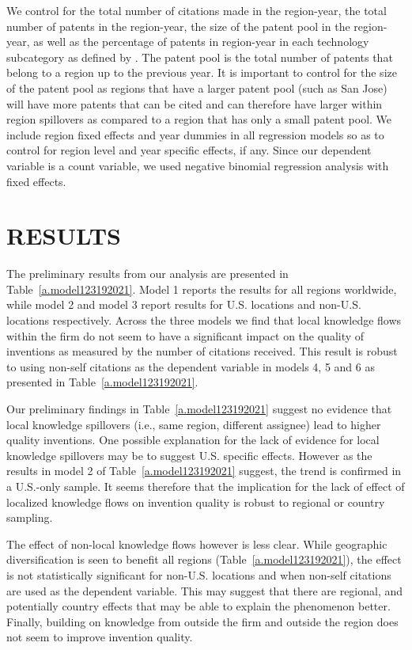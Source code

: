 \documentclass[parskip=full,11pt,letterpaper]{article}
\begin{document}
We control for the total number of citations made in the region-year, the total number of patents in the region-year, the size of the patent pool in the region-year, as well as the percentage of patents in region-year in each technology subcategory as defined by \cite*{Hall2001a}. The patent pool is the total number of patents that belong to a region up to the previous year. It is important to control for the size of the patent pool as  regions that have a larger patent pool (such as San Jose) will have more patents that can be cited and can therefore have larger within region spillovers as compared to a region that has only a small patent pool. We include region fixed effects and year dummies in all regression models so as to control for region level and year specific effects, if any. Since our dependent variable is a count variable, we used negative binomial regression analysis with fixed effects.

\section*{RESULTS}
The preliminary results from our analysis are presented in Table~\ref{a.model123192021}. Model 1 reports the results for all regions worldwide, while model 2 and model 3 report results for U.S. locations and non-U.S. locations respectively. Across the three models we find that local knowledge flows within the firm do not seem to have a significant impact on the quality of inventions as measured by the number of citations received. This result is robust to using non-self citations as the dependent variable in models 4, 5 and 6 as presented in Table~\ref{a.model123192021}. \par
Our preliminary findings in Table~\ref{a.model123192021} suggest no evidence that local knowledge spillovers (i.e., same region, different assignee) lead to higher quality inventions.  One possible explanation for the lack of evidence for local knowledge spillovers may be to suggest U.S. specific effects. However as the results in model 2 of Table~\ref{a.model123192021} suggest, the trend is confirmed in a U.S.-only sample. It seems therefore that the implication for the lack of effect of localized knowledge flows on invention quality is robust to regional or country sampling. \par
The effect of non-local knowledge flows however is less clear. While geographic diversification is seen to benefit all regions (Table~\ref{a.model123192021}), the effect is not statistically significant for non-U.S. locations and when non-self citations are used as the dependent variable. This may suggest that there are regional, and potentially country effects that may be able to explain the phenomenon better. Finally, building on knowledge from outside the firm and outside the region does not seem to improve invention quality.\par
\end{document}
